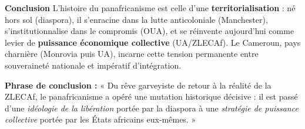\documentclass[11pt]{article}
\begin{document}
\begin{exoresolu}
\textbf{Conclusion}
L'histoire du panafricanisme est celle d'une \textbf{territorialisation} : né hors sol (diaspora), il s'enracine dans la lutte anticoloniale (Manchester), s'institutionnalise dans le compromis (OUA), et se réinvente aujourd'hui comme levier de \textbf{puissance économique collective} (UA/ZLECAf). Le Cameroun, pays charnière (Monrovia puis UA), incarne cette tension permanente entre souveraineté nationale et impératif d'intégration.

\textbf{Phrase de conclusion :} « Du rêve garveyiste de retour à la réalité de la ZLECAf, le panafricanisme a opéré une mutation historique décisive : il est passé d'une \emph{idéologie de la libération} portée par la diaspora à une \emph{stratégie de puissance collective} portée par les États africains eux-mêmes. »
\end{exoresolu}
\end{document}
